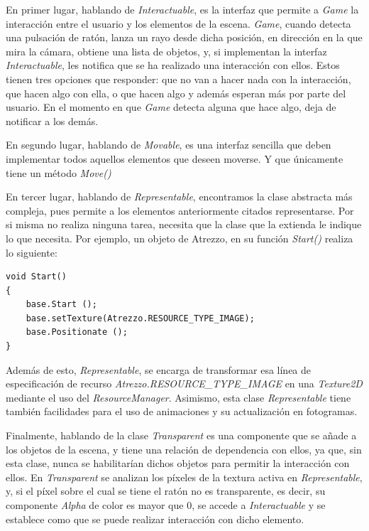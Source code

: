 En primer lugar, hablando de \textit{Interactuable}, es la interfaz que permite a \textit{Game} la interacción entre el usuario y los elementos de la escena. \textit{Game}, cuando detecta una pulsación de ratón, lanza un rayo desde dicha posición, en dirección en la que mira la cámara, obtiene una lista de objetos, y, si implementan la interfaz \textit{Interactuable}, les notifica que se ha realizado una interacción con ellos. Estos tienen tres opciones que responder: que no van a hacer nada con la interacción, que hacen algo con ella, o que hacen algo y además esperan más por parte del usuario. En el momento en que \textit{Game} detecta alguna que hace algo, deja de notificar a los demás.

En segundo lugar, hablando de \textit{Movable}, es una interfaz sencilla que deben implementar todos aquellos elementos que deseen moverse. Y que únicamente tiene un método \textit{Move()}

En tercer lugar, hablando de \textit{Representable}, encontramos la clase abstracta más compleja, pues permite a los elementos anteriormente citados representarse. Por si misma no realiza ninguna tarea, necesita que la clase que la extienda le indique lo que necesita. Por ejemplo, un objeto de Atrezzo, en su función \textit{Start()} realiza lo siguiente:

\begin{lstlisting}
void Start()
{
	base.Start ();
	base.setTexture(Atrezzo.RESOURCE_TYPE_IMAGE);
	base.Positionate ();
}
\end{lstlisting}

Además de esto, \textit{Representable}, se encarga de transformar esa línea de especificación de recurso \textit{Atrezzo.RESOURCE\_TYPE\_IMAGE} en una \textit{Texture2D} mediante el uso del \textit{ResourceManager}. Asimismo, esta clase \textit{Representable} tiene también facilidades para el uso de animaciones y su actualización en fotogramas.

Finalmente, hablando de la clase \textit{Transparent} es una componente que se añade a los objetos de la escena, y tiene una relación de dependencia con ellos, ya que, sin esta clase, nunca se habilitarían dichos objetos para permitir la interacción con ellos. En \textit{Transparent} se analizan los píxeles de la textura activa en \textit{Representable}, y, si el píxel sobre el cual se tiene el ratón no es transparente, es decir, su componente \textit{Alpha} de color es mayor que 0, se accede a \textit{Interactuable} y se establece como que se puede realizar interacción con dicho elemento.

